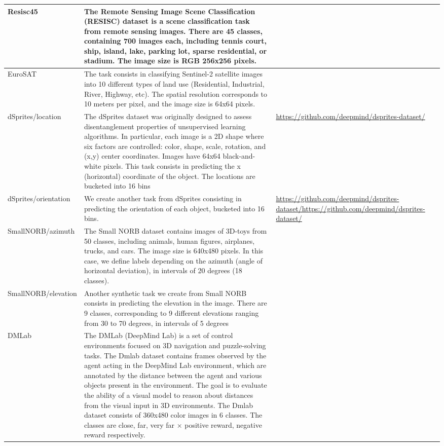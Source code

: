 \documentclass{article}
\begin{document}
\begin{table}[ht]
{{\begin{tabular}{l p{12cm} p{5cm}}
        Resisc45 & The Remote Sensing Image Scene Classification (RESISC) dataset is a scene classification task from remote sensing images. There are 45 classes, containing 700 images each, including tennis court, ship, island, lake, parking lot, sparse residential, or stadium. The image size is RGB 256x256 pixels. &~\citep{cheng2017remote} \\ \midrule
        EuroSAT & The task consists in classifying Sentinel-2 satellite images into 10 different types of land use (Residential, Industrial, River, Highway, etc). The spatial resolution corresponds to 10 meters per pixel, and the image size is 64x64 pixels. &~\citep{helber2019eurosat} \\ \midrule
        dSprites/location & The dSprites dataset was originally designed to assess disentanglement properties of unsupervised learning algorithms. In particular, each image is a 2D shape where six factors are controlled: color, shape, scale, rotation, and (x,y) center coordinates. Images have 64x64 black-and-white pixels. This task consists in predicting the x (horizontal) coordinate of the object. The locations are bucketed into 16 bins & \url{https://github.com/deepmind/dsprites-dataset/}\\ \midrule
        dSprites/orientation & We create another task from dSprites consisting in predicting the orientation of each object, bucketed into 16 bins. & \url{https://github.com/deepmind/dsprites-dataset/https://github.com/deepmind/dsprites-dataset/} \\ \midrule
        SmallNORB/azimuth & The Small NORB dataset contains images of 3D-toys from 50 classes, including animals, human figures, airplanes, trucks, and cars. The image size is 640x480 pixels. In this case, we define labels depending on the azimuth (angle of horizontal deviation), in intervals of 20 degrees (18 classes). &~\citep{lecun2004learning}\\ \midrule
        SmallNORB/elevation & Another synthetic task we create from Small NORB consists in predicting the elevation in the image. There are 9 classes, corresponding to 9 different elevations ranging from 30 to 70 degrees, in intervals of 5 degrees & ~\citep{lecun2004learning} \\ \midrule
        DMLab & The DMLab (DeepMind Lab) is a set of control environments focused on 3D navigation and puzzle-solving tasks. The Dmlab dataset contains frames observed by the agent acting in the DeepMind Lab environment, which are annotated by the distance between the agent and various objects present in the environment. The goal is to evaluate the ability of a visual model to reason about distances from the visual input in 3D environments. The Dmlab dataset consists of 360x480 color images in 6 classes. The classes are {close, far, very far} × {positive reward, negative reward} respectively. &~\citep{beattie2016deepmind} \\ \midrule

\end{tabular}}}
\end{table}
\end{document}
